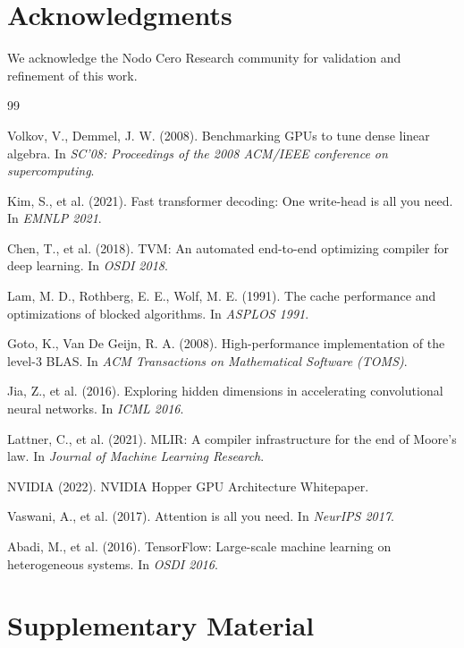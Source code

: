 \documentclass[11pt,twocolumn]{article}
\begin{document}
\section*{Acknowledgments}

We acknowledge the Nodo Cero Research community for validation and refinement of this work.

\begin{thebibliography}{99}

 Volkov, V., Demmel, J. W. (2008). Benchmarking GPUs to tune dense linear algebra. In \textit{SC'08: Proceedings of the 2008 ACM/IEEE conference on supercomputing}.

 Kim, S., et al. (2021). Fast transformer decoding: One write-head is all you need. In \textit{EMNLP 2021}.

 Chen, T., et al. (2018). TVM: An automated end-to-end optimizing compiler for deep learning. In \textit{OSDI 2018}.

 Lam, M. D., Rothberg, E. E., Wolf, M. E. (1991). The cache performance and optimizations of blocked algorithms. In \textit{ASPLOS 1991}.

 Goto, K., Van De Geijn, R. A. (2008). High-performance implementation of the level-3 BLAS. In \textit{ACM Transactions on Mathematical Software (TOMS)}.

 Jia, Z., et al. (2016). Exploring hidden dimensions in accelerating convolutional neural networks. In \textit{ICML 2016}.

 Lattner, C., et al. (2021). MLIR: A compiler infrastructure for the end of Moore's law. In \textit{Journal of Machine Learning Research}.

 NVIDIA (2022). NVIDIA Hopper GPU Architecture Whitepaper.

 Vaswani, A., et al. (2017). Attention is all you need. In \textit{NeurIPS 2017}.

 Abadi, M., et al. (2016). TensorFlow: Large-scale machine learning on heterogeneous systems. In \textit{OSDI 2016}.

\end{thebibliography}

\newpage

\section*{Supplementary Material}
\end{document}
